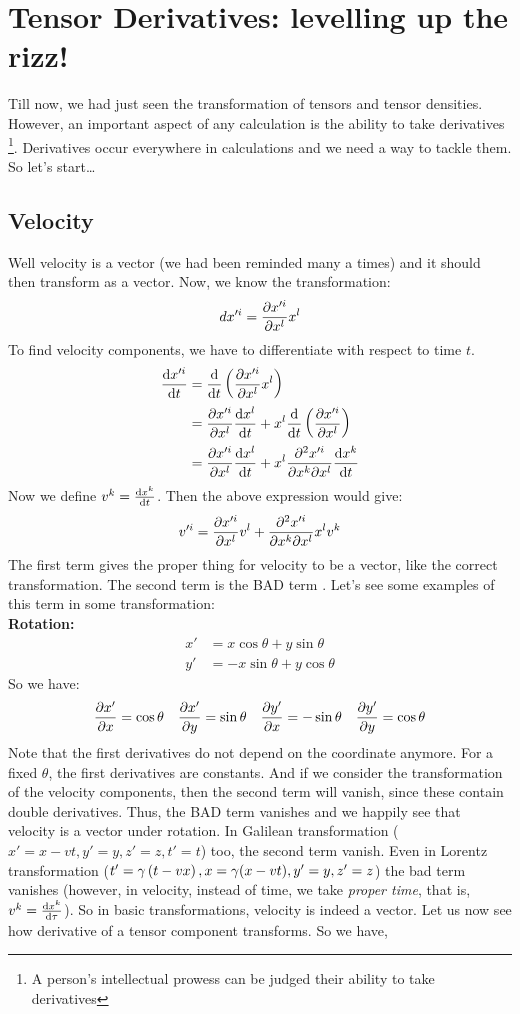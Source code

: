 \section{Tensor Derivatives: levelling up the rizz!}
Till now, we had just seen the transformation of tensors and tensor densities. However, an important aspect of any calculation is the ability to take derivatives \footnote{A person's intellectual prowess can be judged their ability to take derivatives }. Derivatives occur everywhere in calculations and we need a way to tackle them. So let's start\dots

\subsection{Velocity}
Well velocity is a vector (we had been reminded many a times) and it should then transform as a vector. Now, 
we know the transformation:
$$dx'^i = \pdv{x'^i}{x^l}x^l$$
To find velocity components, we have to differentiate with respect to time $t$. 
\begin{align*}
    \dv{x'^i}{t} &= \dv{t}\left( \pdv{x'^i}{x^l}x^l \right)\\
    &=\pdv{x'^i}{x^l}\dv{x^l}{t} + x^l \dv{t}\left( \pdv{x'^i}{x^l} \right)\\
    &=\pdv{x'^i}{x^l}\dv{x^l}{t} + x^l \pdv{x'^i}{x^k}{x^l}\dv{x^k}{t}
\end{align*}
Now we define $v^k = \dv{x^k}{t}$. Then the above expression would give:
\begin{align*}
    v'^i = \pdv{x'^i}{x^l}v^l +  \pdv{x'^i}{x^k}{x^l}x^l v^k
\end{align*}
The first term gives the proper thing for velocity to be a vector, like the correct transformation. The second term is the BAD term . Let's see some examples of this term in some transformation:\\[0.3cm]
\textbf{Rotation:}
\begin{align*}
    x' &= x\cos\theta+y\sin\theta\\
    y'&=-x\sin\theta + y\cos\theta
\end{align*}
So we have: 
\begin{align*}
    \pdv{x'}{x} = \cos\theta \quad  \pdv{x'}{y} = \sin\theta \quad  \pdv{y'}{x} = -\sin\theta \quad
    \pdv{y'}{y} = \cos\theta
\end{align*}
Note that the first derivatives do not depend on the coordinate anymore. For a fixed $\theta$, the first derivatives are constants. 
And if we consider the transformation of the velocity components, then the second term will vanish, since these contain double derivatives. Thus, the BAD term vanishes and we happily see that velocity is a vector under rotation. In Galilean transformation ($x'=x-vt, y'=y, z'=z, t'=t$) too, the second term vanish. Even in Lorentz transformation ($t' = \gamma \left( t-vx \right), x=\gamma(x-vt), y'=y, z'=z$) the bad term vanishes (however, in velocity, instead of time, we take \textit{proper time}, that is, $v^k = \dv{x^k}{\tau}$). So in basic transformations, velocity is indeed a vector. Let us now see how derivative of a tensor component transforms. So we have,
